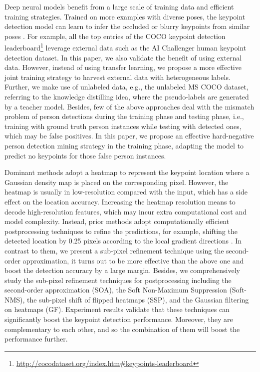\documentclass[twocolumn]{svjour3}          \smartqed  \usepackage{natbib}
\begin{document}
Deep neural models benefit from a large scale of training data and efficient training strategies. Trained on more examples with diverse poses, the keypoint detection model can learn to infer the occluded or blurry keypoints from similar poses \citep{xiao2018simple,li2019rethinking}. For example, all the top entries of the COCO keypoint detection leaderboard\footnote{\url{http://cocodataset.org/index.htm#keypoints-leaderboard}} leverage external data such as the AI Challenger human keypoint detection dataset. In this paper, we also validate the benefit of using external data. However, instead of using transfer learning, we propose a more effective joint training strategy to harvest external data with heterogeneous labels. Further, we make use of unlabeled data, e.g., the unlabeled MS COCO dataset, referring to the knowledge distilling idea, where the pseudo-labels are generated by a teacher model. Besides, few of the above approaches deal with the mismatch problem of person detections during the training phase and testing phase, i.e., training with ground truth person instances while testing with detected ones, which may be false positives. In this paper, we propose an effective hard-negative person detection mining strategy in the training phase, adapting the model to predict no keypoints for those false person instances.

Dominant methods adopt a heatmap to represent the keypoint location where a Gaussian density map is placed on the corresponding pixel. However, the heatmap is usually in low-resolution compared with the input, which has a side effect on the location accuracy. Increasing the heatmap resolution means to decode high-resolution features, which may incur extra computational cost and model complexity. Instead, prior methods adopt computationally efficient postprocessing techniques to refine the predictions, for example, shifting the detected location by 0.25 pixels according to the local gradient directions \citep{chen2018cascaded,xiao2018simple,sun2019deep}. In contrast to them, we present a sub-pixel refinement technique using the second-order approximation, it turns out to be more effective than the above one and boost the detection accuracy by a large margin. Besides, we comprehensively study the sub-pixel refinement techniques for postprocessing including the second-order approximation (SOA), the Soft Non-Maximum Suppression (Soft-NMS), the sub-pixel shift of flipped heatmaps (SSP), and the Gaussian filtering on heatmaps (GF). Experiment results validate that these techniques can significantly boost the keypoint detection performance. Moreover, they are complementary to each other, and so the combination of them will boost the performance further.
\end{document}
